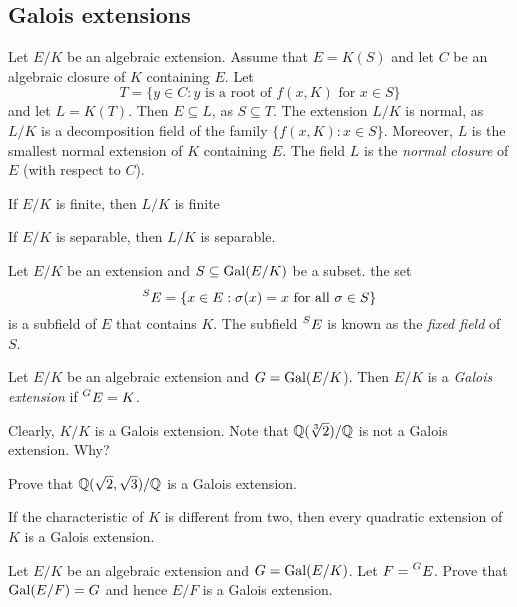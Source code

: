 \subsection{Galois extensions}

Let $E/K$ be an algebraic extension. Assume that $E=K(S)$ and
let $C$ be an algebraic closure of $K$ containing $E$. Let 
\[
T=\{y\in C:y\text{ is a root of $f(x,K)$ for $x\in S$}\}
\]
and let $L=K(T)$. Then $E\subseteq L$, as $S\subseteq T$. The extension
$L/K$ is normal, as $L/K$ is a decomposition field of the family $\{f(x,K):x\in S\}$. 
Moreover, $L$ is the smallest normal extension of $K$ containing $E$. The field
$L$ is the \emph{normal closure} of $E$ (with respect to $C$). 

\begin{exercise}
If $E/K$ is finite, then $L/K$ is finite
\end{exercise}

\begin{exercise}
If $E/K$ is separable, then $L/K$ is separable.
\end{exercise}

Let $E/K$ be an extension and $S\subseteq\operatorname{Gal}(E/K)$ be a subset. 
the set 
\[
    \prescript{S}{}{E}=\{x\in E:\sigma(x)=x\text{ for all $\sigma\in S$}\}
\]
is a subfield of $E$ that contains $K$. The subfield $\prescript{S}{}{E}$
is known as the \emph{fixed field} of $S$. 

\begin{definition}
    Let $E/K$ be an algebraic extension and $G=\operatorname{Gal}(E/K$). 
    Then $E/K$ is a \emph{Galois extension} if $\prescript{G}{}{E}=K$. 
\end{definition}

Clearly, $K/K$ is a Galois extension. 
Note that $\mathbb{Q}(\sqrt[3]{2})/\mathbb{Q}$ is not a Galois extension. Why?

\begin{exercise}
    Prove that $\mathbb{Q}(\sqrt{2},\sqrt{3})/\mathbb{Q}$ is a Galois extension. 
\end{exercise}

\begin{exercise}
If the characteristic of $K$ is different from two, 
then every quadratic extension of $K$ is a Galois extension. 
\end{exercise}

\begin{exercise}
    Let $E/K$ be an algebraic extension and $G=\operatorname{Gal}(E/K)$. Let
    $F=\prescript{G}{}{E}$. Prove that $\operatorname{Gal}(E/F)=G$ and hence $E/F$ is a Galois extension. 
\end{exercise}

